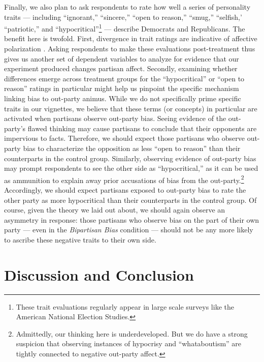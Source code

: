 \documentclass[12pt, letterpaper]{article}
\begin{document}
Finally, we also plan to ask respondents to rate how well a series of personality traits --- including ``ignorant,'' ``sincere,'' ``open to reason,'' ``smug,'' ``selfish,' ``patriotic,'' and ``hypocritical''\footnote{These trait evaluations regularly appear in large scale surveys like the American National Election Studies.} --- describe Democrats and Republicans. The benefit here is twofold. First, divergence in trait ratings are indicative of affective polarization \citep{hetheringtonlongrudolph_2016}. Asking respondents to make these evaluations post-treatment thus gives us another set of dependent variables to analyze for evidence that our experiment produced changes partisan affect. Secondly, examining whether differences emerge across treatment groups for the ``hypocritical'' or ``open to reason'' ratings in particular might help us pinpoint the specific mechanism linking bias to out-party animus. While we do not specifically prime specific traits in our vignettes, we believe that these terms (or concepts) in particular are activated when partisans observe out-party bias. Seeing evidence of the out-party's flawed thinking may cause partisans to conclude that their opponents are impervious to facts. Therefore, we should expect those partisans who observe out-party bias to characterize the opposition as less ``open to reason'' than their counterparts in the control group. Similarly, observing evidence of out-party bias may prompt respondents to see the other side as ``hypocritical,'' as it can be used as ammunition to explain away prior accusations of bias from the out-party.\footnote{Admittedly, our thinking here is underdeveloped. But we do have a strong suspicion that observing instances of hypocrisy and ``whataboutism'' are tightly connected to negative out-party affect.} Accordingly, we should expect partisans exposed to out-party bias to rate the other party as more hypocritical than their counterparts in the control group. Of course, given the theory we laid out about, we should again observe an asymmetry in response: those partisans who observe bias on the part of their own party --- even in the \textit{Bipartisan Bias} condition --- should not be any more likely to ascribe these negative traits to their own side. 

\section*{Discussion and Conclusion}

\clearpage



\end{document}
